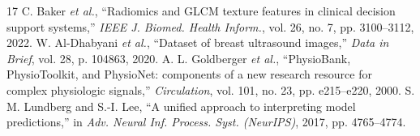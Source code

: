 \documentclass[conference]{IEEEtran}
\begin{document}
\begin{thebibliography}{17}
 C. Baker \textit{et al.}, ``Radiomics and GLCM texture features in clinical decision support systems,'' \textit{IEEE J. Biomed. Health Inform.}, vol. 26, no. 7, pp. 3100--3112, 2022.
 W. Al-Dhabyani \textit{et al.}, ``Dataset of breast ultrasound images,'' \textit{Data in Brief}, vol. 28, p. 104863, 2020.
 A. L. Goldberger \textit{et al.}, ``PhysioBank, PhysioToolkit, and PhysioNet: components of a new research resource for complex physiologic signals,'' \textit{Circulation}, vol. 101, no. 23, pp. e215--e220, 2000.
 S. M. Lundberg and S.-I. Lee, ``A unified approach to interpreting model predictions,'' in \textit{Adv. Neural Inf. Process. Syst. (NeurIPS)}, 2017, pp. 4765--4774.
\end{thebibliography}
\end{document}
